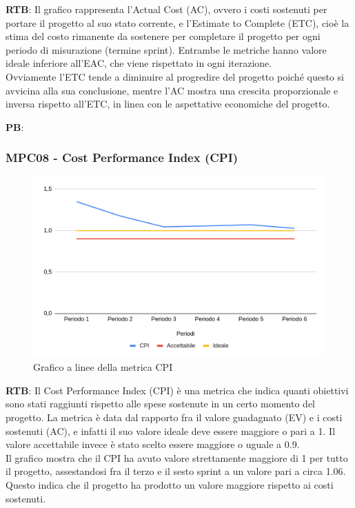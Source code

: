 \documentclass[10pt]{article}
\begin{document}
\begin{justify}
\textbf{RTB}: Il grafico rappresenta l'Actual Cost (AC), ovvero i costi sostenuti per portare il progetto al suo stato corrente, e l'Estimate to Complete (ETC), 
cioè la stima del costo rimanente da sostenere per completare il progetto per ogni periodo di misurazione (termine sprint). Entrambe le metriche hanno valore ideale
inferiore all'EAC, che viene rispettato in ogni iterazione.\\
Ovviamente l'ETC tende a diminuire al progredire del progetto poiché questo si avvicina alla sua conclusione, mentre l'AC mostra una crescita proporzionale e inversa 
rispetto all'ETC, in linea con le aspettative economiche del progetto.

\noindent
\textbf{PB}:


\subsubsection{MPC08 - Cost Performance Index (CPI)}%

\begin{figure}[H]
  \centering
  \includegraphics[width=0.9\linewidth]{CPI.png}
  \caption{Grafico a linee della metrica CPI}
  \label{fig:CPIchart}
\end{figure}

\textbf{RTB}: Il Cost Performance Index (CPI) è una metrica che indica quanti obiettivi sono stati raggiunti rispetto alle spese sostenute in un certo momento del
progetto. La metrica è data dal rapporto fra il valore guadagnato (EV) e i costi sostenuti (AC), e infatti il suo valore ideale deve essere maggiore o pari a 1.
Il valore accettabile invece è stato scelto essere maggiore o uguale a 0.9.\\
Il grafico mostra che il CPI ha avuto valore strettamente maggiore di 1 per tutto il progetto, assestandosi fra il terzo e il sesto sprint a un valore pari a circa 1.06.
Questo indica che il progetto ha prodotto un valore maggiore rispetto ai costi sostenuti.


\end{justify}
\end{document}
